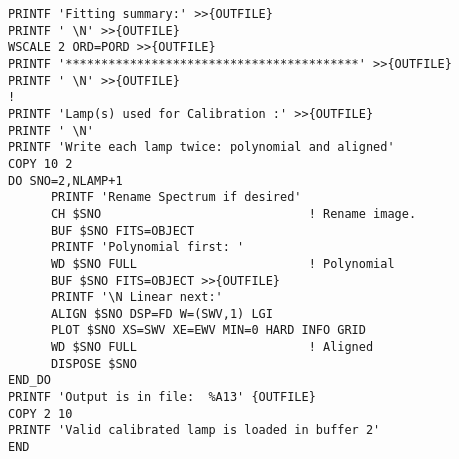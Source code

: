 \begin{verbatim}
PRINTF 'Fitting summary:' >>{OUTFILE}
PRINTF ' \N' >>{OUTFILE}
WSCALE 2 ORD=PORD >>{OUTFILE}
PRINTF '*****************************************' >>{OUTFILE}
PRINTF ' \N' >>{OUTFILE}
!
PRINTF 'Lamp(s) used for Calibration :' >>{OUTFILE}
PRINTF ' \N'
PRINTF 'Write each lamp twice: polynomial and aligned'
COPY 10 2
DO SNO=2,NLAMP+1
      PRINTF 'Rename Spectrum if desired'
      CH $SNO                             ! Rename image.
      BUF $SNO FITS=OBJECT
      PRINTF 'Polynomial first: '
      WD $SNO FULL                        ! Polynomial
      BUF $SNO FITS=OBJECT >>{OUTFILE}
      PRINTF '\N Linear next:'
      ALIGN $SNO DSP=FD W=(SWV,1) LGI
      PLOT $SNO XS=SWV XE=EWV MIN=0 HARD INFO GRID
      WD $SNO FULL                        ! Aligned
      DISPOSE $SNO
END_DO
PRINTF 'Output is in file:  %A13' {OUTFILE}
COPY 2 10
PRINTF 'Valid calibrated lamp is loaded in buffer 2'
END
\end{verbatim}


%
